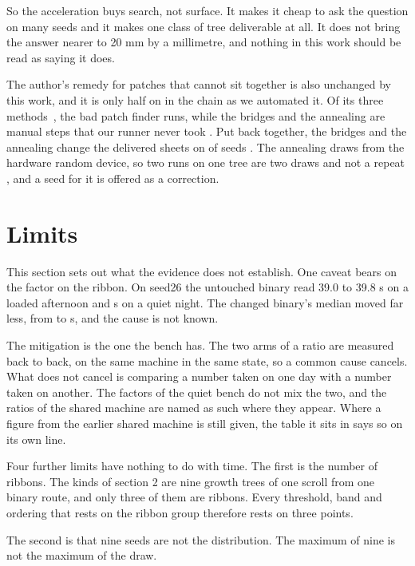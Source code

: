So the acceleration buys search, not surface. It makes it cheap to ask the question on many seeds and it makes one class of tree deliverable at all. It does not bring the answer nearer to 20 mm by a millimetre, and nothing in this work should be read as saying it does.

The author's remedy for patches that cannot sit together is also unchanged by this work, and it is only half on in the chain as we automated it. Of its three methods~\cite{stevensreport12}, the bad patch finder runs, while the bridges and the annealing are manual steps that our runner never took {}. Put back together, the bridges and the annealing change the delivered sheets on \RemedySeedsChanged{} of \RemedySeedsMeasured{} seeds {}. The annealing draws from the hardware random device, so two runs on one tree are two draws and not a repeat {}, and a seed for it is offered as a correction.

\section{Limits}

This section sets out what the evidence does not establish. One caveat bears on the factor on the ribbon. On seed26 the untouched binary read 39.0 to 39.8 s on a loaded afternoon and \BenchPlainSeedTwentySixMax{} s on a quiet night. The changed binary's median moved far less, from \SpreadBothMedian{} to \BenchBothSeedTwentySixMedian{} s, and the cause is not known.

The mitigation is the one the bench has. The two arms of a ratio are measured back to back, on the same machine in the same state, so a common cause cancels. What does not cancel is comparing a number taken on one day with a number taken on another. The factors of the quiet bench do not mix the two, and the ratios of the shared machine are named as such where they appear. Where a figure from the earlier shared machine is still given, the table it sits in says so on its own line.

Four further limits have nothing to do with time. The first is the number of ribbons. The kinds of section 2 are nine growth trees of one scroll from one binary route, and only three of them are ribbons. Every threshold, band and ordering that rests on the ribbon group therefore rests on three points.

The second is that nine seeds are not the distribution. The maximum of nine is not the maximum of the draw.


